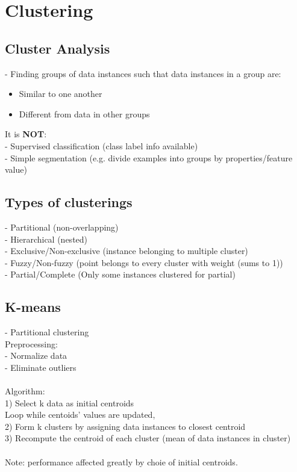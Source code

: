 \section{Clustering}
\subsection*{Cluster Analysis}
- Finding groups of data instances such that data instances in a group are:
\begin{itemize}
    \item Similar to one another
    \item Different from data in other groups
\end{itemize}
It is \textbf{NOT}:\\
- Supervised classification (class label info available)\\
- Simple segmentation (e.g. divide examples into groups by properties/feature value)\\

\subsection*{Types of clusterings}
- Partitional (non-overlapping)\\
- Hierarchical (nested)\\
- Exclusive/Non-exclusive (instance belonging to multiple cluster)\\
- Fuzzy/Non-fuzzy (point belongs to every cluster with weight (sums to 1))\\
- Partial/Complete (Only some instances clustered for partial)\\

\subsection*{K-means}
- Partitional clustering\\
Preprocessing:\\
- Normalize data\\
- Eliminate outliers\\\\
Algorithm:\\
1) Select k data as initial centroids\\
Loop while centoids' values are updated,\\
2) Form k clusters by assigning data instances to closest centroid\\
3) Recompute the centroid of each cluster (mean of data instances in cluster)\\\\
Note: performance affected greatly by choie of initial centroids.


